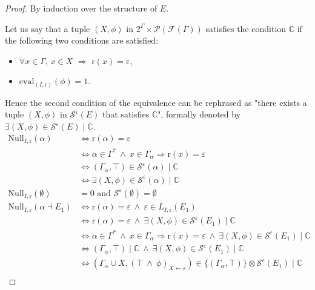 \documentclass[a4paper]{llncs}
\begin{document}
  \begin{proof}
    By induction over the structure of $E$.
    
    Let us say that a tuple $(X,\phi)$ in $2^\Gamma\times \mathcal{P}(\mathcal{F}(\Gamma))$ satisfies the condition $\mathbb{C}$ if the  following two conditions are satisfied:
          \begin{itemize}
            \item $\forall x\in\Gamma$, $x\in X$ $\Rightarrow$ $\mathrm{r}(x)=\varepsilon$,
            \item $\mathrm{eval}_{(I,\mathrm{r})}(\phi)=1$.
          \end{itemize}
          
    Hence the second condition of the equivalence can be rephrased as "there exists a tuple $(X,\phi)$ in $\mathcal{S}^{\varepsilon}(E)$ that satisfies $\mathbb{C}$", formally denoted by $\exists(X,\phi)\in \mathcal{S}^{\varepsilon}(E)\mid\mathbb{C}$.
        \begin{align*}
        \mathrm{Null}_{I,\mathrm{r}}(\alpha) & \Longleftrightarrow \mathrm{r}(\alpha)=\varepsilon \\
        & \Longleftrightarrow \alpha\in\Gamma^*\ \wedge\ x\in\Gamma_\alpha \Rightarrow \mathrm{r}(x)=\varepsilon\\
        & \Longleftrightarrow(\Gamma_\alpha,\top)\in \mathcal{S}^{\varepsilon}(\alpha) \mid \mathbb{C}\\
        & \Longleftrightarrow \exists (X,\phi)\in \mathcal{S}^{\varepsilon}(\alpha) \mid \mathbb{C}\\
        \mathrm{Null}_{I,\mathrm{r}}(\emptyset)&=0\text{ and }\mathcal{S}^{\varepsilon}(\emptyset)=\emptyset\\
        \mathrm{Null}_{I,\mathrm{r}}(\alpha\dashv E_1) & \Longleftrightarrow \mathrm{r}(\alpha)=\varepsilon\ \wedge\ \varepsilon\in L_{I,\mathrm{r}}(E_1)\\
        & \Longleftrightarrow \mathrm{r}(\alpha)=\varepsilon\ \wedge\ \exists(X,\phi)\in\mathcal{S}^{\varepsilon}(E_1)\mid\mathbb{C}\\
        & \Longleftrightarrow \alpha\in\Gamma^*\ \wedge\ x\in\Gamma_\alpha\Rightarrow\mathrm{r}(x)=\varepsilon\ \wedge\ \exists(X,\phi)\in\mathcal{S}^{\varepsilon}(E_1)\mid\mathbb{C}\\
        & \Longleftrightarrow (\Gamma_\alpha,\top)\mid\mathbb{C}\ \wedge\ \exists(X,\phi)\in\mathcal{S}^{\varepsilon}(E_1)\mid\mathbb{C}\\
        & \Longleftrightarrow (\Gamma_\alpha\cup X,(\top\ \wedge\ \phi)_{X\leftarrow\varepsilon})\in \{(\Gamma_\alpha,\top)\}\otimes \mathcal{S}^{\varepsilon}(E_1)\mid\mathbb{C}\\

\end{align*}
\end{proof}
\end{document}
